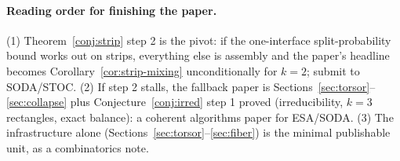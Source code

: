 \documentclass[11pt]{article}
\begin{document}
\paragraph{Reading order for finishing the paper.}
(1) Theorem~\ref{conj:strip} step 2 is the pivot: if the one-interface
split-probability bound works out on strips, everything else is assembly
and the paper's headline becomes Corollary~\ref{cor:strip-mixing}
unconditionally for $k = 2$; submit to SODA/STOC. (2) If step 2 stalls,
the fallback paper is Sections~\ref{sec:torsor}--\ref{sec:collapse} plus
Conjecture~\ref{conj:irred} step 1 proved (irreducibility, $k = 3$
rectangles, exact balance): a coherent algorithms paper for ESA/SODA.
(3) The infrastructure alone (Sections~\ref{sec:torsor}--\ref{sec:fiber})
is the minimal publishable unit, as a combinatorics note.
\end{document}
